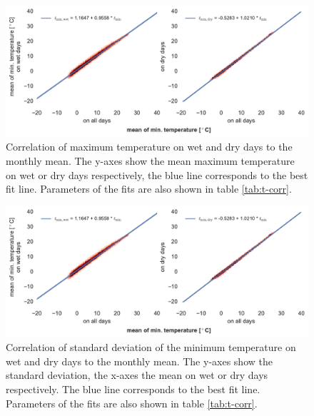 \begin{refsection}
\begin{figure}
	\label{fig:tmin_sd}
\end{figure}
\begin{figure}
	\includegraphics[width=12cm, page=3]{figures/temp.pdf}
	\caption[Correlation of maximum temperature on wet and dry days to the monthly mean]{Correlation of maximum temperature on wet and dry days to the monthly mean. The y-axes show the mean maximum temperature on wet or dry days respectively, the blue line corresponds to the best fit line. Parameters of the fits are also shown in table \ref{tab:t-corr}.}
	\label{fig:tmax}
\end{figure}
\begin{figure}
	\includegraphics[width=12cm, page=4]{figures/temp.pdf}
	\caption[Correlation of standard deviation of min. temperature to the monthly mean]{Correlation of standard deviation of the minimum temperature on wet and dry days to the monthly mean. The y-axes show the standard deviation, the x-axes the mean on wet or dry days respectively. The blue line corresponds to the best fit line. Parameters of the fits are also shown in table \ref{tab:t-corr}.}
	\label{fig:tmax_sd}
\end{figure}
\begin{table}[t]
	\caption[Fit results of temperature correlation for wet and dry days.]{Fit results of temperature correlation for wet and dry days for figure \ref{fig:tmin} and \ref{fig:tmax}. $N$ is the total number of measurements used for the fit. The values of $a$ and $b$ correspond to the values in equation \eqref{eq:linear} and \eqref{eq:sd_linear}.}
	\label{tab:t-corr}
	
\end{table}


\end{refsection}
